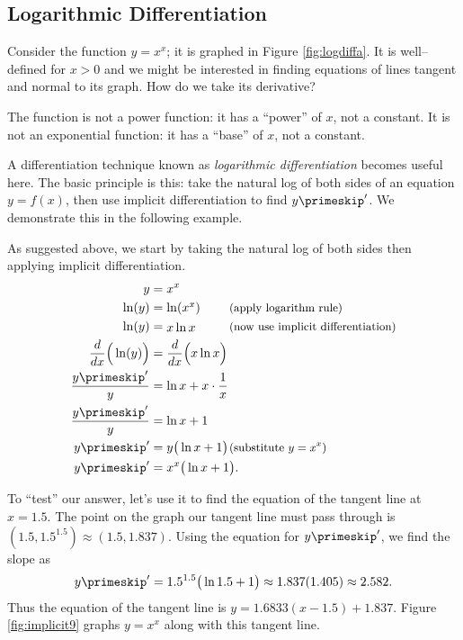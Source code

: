 \subsection*{Logarithmic Differentiation}

Consider the function $y=x^x$; it is graphed in Figure \ref{fig:logdiffa}. It is well--defined for $x>0$ and we might be interested in finding equations of lines tangent and normal to its graph. How do we take its derivative?

The function is not a power function: it has a ``power'' of $x$, not a constant. It is not an exponential function: it has a ``base'' of $x$, not a constant. 

A differentiation technique known as \emph{logarithmic differentiation} becomes useful here. The basic principle is this: take the natural log of both sides of an equation $y=f(x)$, then use implicit differentiation to find $y\primeskip'$. We demonstrate this in the following example.\\

{As suggested above, we start by taking the natural log of both sides then applying implicit differentiation.
\begin{align*}
y &= x^x \\
\ln (y) &= \parbox{50pt}{$\ln (x^x)$} \text{\small (apply logarithm rule)}\\
\ln (y) &= \parbox{50pt}{$x\ln x$}  \text{\small (now use implicit differentiation)}\\
\frac{d}{dx}\Big(\ln (y)\Big) &= \frac{d}{dx}\Big(x\ln x\Big) \\
\frac{y\primeskip'}{y} &= \ln x + x\cdot\frac1x\\
\frac{y\primeskip'}{y} &= \ln x + 1\\
y\primeskip' &= \parbox{50pt}{$y\big(\ln x+1\big)$} \text{\small (substitute $y=x^x$)}\\
y\primeskip' &= x^x\big(\ln x+1\big).
\end{align*} 

To ``test'' our answer, let's use it to find the equation of the tangent line at $x=1.5$. The point on the graph our tangent line must pass through is $(1.5, 1.5^{1.5}) \approx (1.5, 1.837)$. Using the equation for $y\primeskip'$, we find the slope as
$$y\primeskip' = 1.5^{1.5}\big(\ln 1.5+1\big) \approx 1.837(1.405) \approx 2.582.$$
Thus the equation of the tangent line is $y = 1.6833(x-1.5)+1.837$. Figure \ref{fig:implicit9} graphs $y=x^x$ along with this tangent line.
}\\



